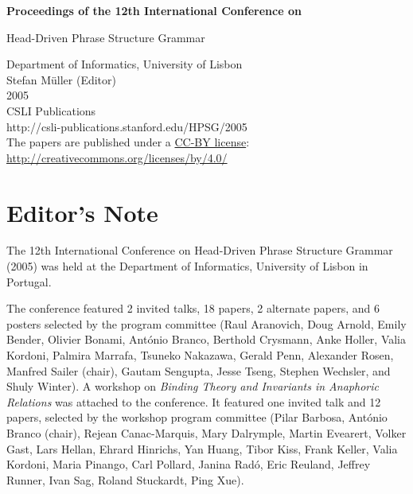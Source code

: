 \documentclass[11pt,a4paper,fleqn]{article}
\begin{document}
\begin{center}
{\Large
                {\bfseries Proceedings of the 12th International Conference on\par Head-Driven Phrase Structure Grammar\par}

                \vspace{8ex}

                     Department of Informatics, University of Lisbon\\[\baselineskip]

                        Stefan M{\"u}ller (Editor)\\[\baselineskip]

                                2005\\[\baselineskip]

                          CSLI Publications\\[\baselineskip]

              http://csli-publications.stanford.edu/HPSG/2005 \\[4\baselineskip]

The papers are published under a \href{http://creativecommons.org/licenses/by/4.0/}{CC-BY license}:\\[3pt]
\href{http://creativecommons.org/licenses/by/4.0/}{http://creativecommons.org/licenses/by/4.0/}
}
\end{center}
\newpage
\tableofcontents

\newpage

\section{Editor's Note}
The 12th International Conference on Head-Driven Phrase Structure Grammar (2005) was held at
the Department of Informatics, University of Lisbon in Portugal.

The conference featured 2 invited talks, 18 papers, 2 alternate papers, and 6 posters
selected by the program committee 
(Raul Aranovich,
Doug Arnold,
Emily Bender,
Olivier Bonami,
António Branco,
Berthold Crysmann,
Anke Holler,
Valia Kordoni,
Palmira Marrafa,
Tsuneko Nakazawa,
Gerald Penn,
Alexander Rosen,
Manfred Sailer (chair),
Gautam Sengupta,
Jesse Tseng,
Stephen Wechsler, and
Shuly Winter). 
A workshop on \emph{Binding Theory and Invariants in Anaphoric Relations} was attached to the conference. It featured one invited talk
and 12 papers, selected by the workshop program committee (Pilar Barbosa,
António Branco (chair),
Rejean Canac-Marquis,
Mary Dalrymple,
Martin Evearert,
Volker Gast,
Lars Hellan,
Ehrard Hinrichs,
Yan Huang,
Tibor Kiss,
Frank Keller,
Valia Kordoni,
Maria Pinango,
Carl Pollard,
Janina Radó,
Eric Reuland,
Jeffrey Runner,
Ivan Sag,
Roland Stuckardt,
Ping Xue).
\end{document}
